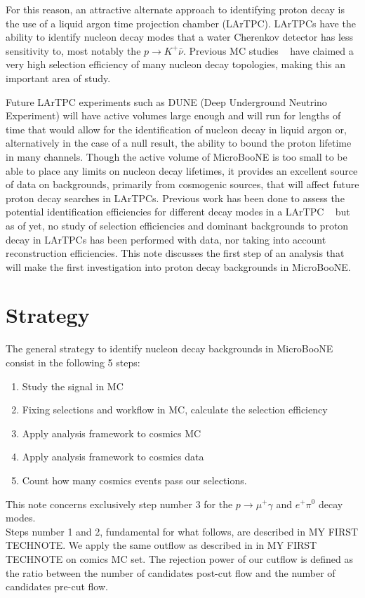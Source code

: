 \documentclass[a4paper, 10pt]{article}
\begin{document}
For this reason, an attractive alternate approach to identifying proton decay is the use of a liquid argon time projection chamber (LArTPC). LArTPCs have the ability to identify nucleon decay modes that a water Cherenkov detector has less sensitivity to, most notably the $p\rightarrow K^{+} \bar{\nu}$.  Previous MC studies ~\cite{Bueno:2007um} have claimed a very high selection efficiency of many nucleon decay topologies, making this an important area of study.

Future LArTPC experiments such as DUNE (Deep Underground Neutrino Experiment) will have active volumes large enough and will run for lengths of time that would allow for the identification of nucleon decay in liquid argon or, alternatively in the case of a null result, the ability to bound the proton lifetime in many channels. Though the active volume of MicroBooNE is too small to be able to place any limits on nucleon decay lifetimes, it provides an excellent source of data on backgrounds, primarily from cosmogenic sources, that will affect future proton decay searches in LArTPCs.
Previous work has been done to assess the potential identification efficiencies for different decay modes in a LArTPC ~\cite{Bueno:2007um} but as of yet, no study of selection efficiencies and dominant backgrounds to proton decay in LArTPCs has been performed with data, nor taking into account reconstruction efficiencies. This note discusses the first step of an analysis that will make the first investigation into proton decay backgrounds in MicroBooNE.


\section{Strategy}
The general strategy to identify nucleon decay backgrounds in MicroBooNE consist in the following 5 steps: 
\begin{enumerate}[topsep=10pt,itemsep=-1ex,partopsep=10pt,parsep=1ex]
\item Study the signal in MC
\item Fixing selections and workflow in MC, calculate the selection efficiency
\item Apply analysis framework to cosmics MC 
\item Apply analysis framework to cosmics data
\item Count how many cosmics events pass our selections.
\end{enumerate}

This note concerns exclusively step number 3 for the $p \rightarrow \mu^{+} \gamma$ and $e^{+} \pi^{0}$  decay modes. \\
Steps number 1 and 2, fundamental for what follows,  are described in MY FIRST TECHNOTE. 
We apply the same outflow as described in in MY FIRST TECHNOTE on comics MC set. The rejection power of our cutflow is defined as the ratio between the number of candidates post-cut flow and the number of candidates pre-cut flow.
\end{document}
